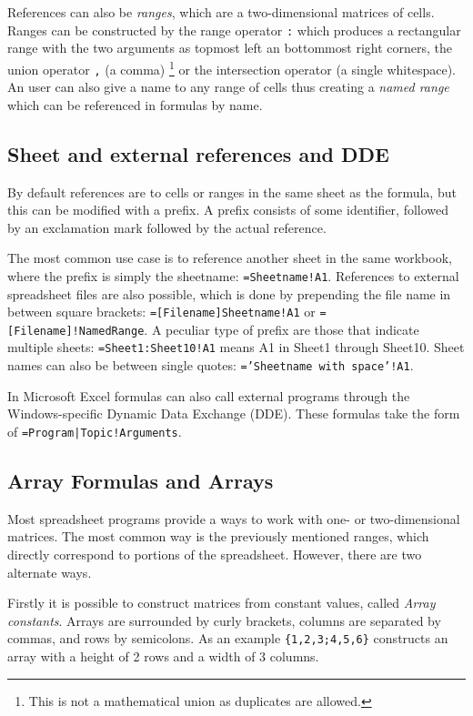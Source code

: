 \documentclass[conference]{IEEEtran}
\begin{document}
References can also be \emph{ranges}, which are a two-dimensional matrices of cells.
Ranges can be constructed by the range operator \texttt{:} which produces a rectangular range with the two arguments as topmost left an bottommost right corners, the union operator \texttt{,} (a comma) \footnote{This is not a mathematical union as duplicates are allowed.} or the intersection operator \texttt{} (a single whitespace). 
An user can also give a name to any range of cells thus creating a \emph{named range} which can be referenced in formulas by name.

\subsection{Sheet and external references and DDE}

By default references are to cells or ranges in the same sheet as the formula, but this can be modified with a prefix. A prefix consists of some identifier, followed by an exclamation mark followed by the actual reference.

The most common use case is to reference another sheet in the same workbook, where the prefix is simply the sheetname: \texttt{=Sheetname!A1}. References to external spreadsheet files are also possible, which is done by prepending the file name in between square brackets: \texttt{=[Filename]Sheetname!A1} or \texttt{=[Filename]!NamedRange}.
A peculiar type of prefix are those that indicate multiple sheets: \texttt{=Sheet1:Sheet10!A1} means A1 in Sheet1 through Sheet10.
Sheet names can also be between single quotes: \texttt{='Sheetname with space'!A1}. 

In Microsoft Excel formulas can also call external programs through the Windows-specific Dynamic Data Exchange (DDE).
These formulas take the form of \texttt{=Program|Topic!Arguments}.

\subsection{Array Formulas and Arrays}

Most spreadsheet programs provide a ways to work with one- or two-dimensional matrices.
The most common way is the previously mentioned ranges, which directly correspond to portions of the spreadsheet.
However, there are two alternate ways.

Firstly it is possible to construct matrices from constant values, called \emph{Array constants}.
Arrays are surrounded by curly brackets, columns are separated by commas, and rows by semicolons.
As an example \texttt{\{1,2,3;4,5,6\}} constructs an array with a height of 2 rows and a width of 3 columns.
\end{document}
